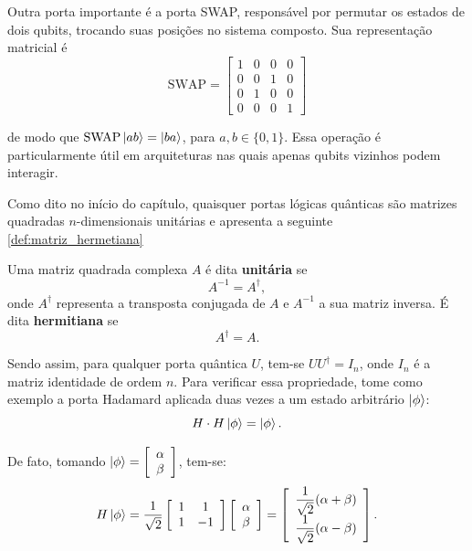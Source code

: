 Outra porta importante é a porta SWAP, responsável por permutar os estados de dois qubits, trocando suas posições no sistema composto. Sua representação matricial é
$$
    \mathrm{SWAP}= \left[
    \begin{array}{cccc}
        1 & 0 & 0 & 0\\
        0 & 0 & 1 & 0\\
        0 & 1 & 0 & 0\\
        0 & 0 & 0 & 1
    \end{array} \right]
$$

\noindent de modo que $\mathrm{SWAP}\ket{ab}=\ket{ba}$, para $a,b\in\{0,1\}$. Essa operação é particularmente útil em arquiteturas nas quais apenas qubits vizinhos podem interagir.

Como dito no início do capítulo, quaisquer portas lógicas quânticas são matrizes quadradas $n$-dimensionais unitárias e \textcite[pag. 425]{Anton2012} apresenta a seguinte
\autoref{def:matriz_hermetiana}

    \begin{defi}
        \label{def:matriz_hermetiana}
        Uma matriz quadrada complexa $A$ é dita \textbf{unitária} se $$A^{-1}=A^{\dagger},$$ onde $A^{\dagger}$ representa a transposta conjugada de $A$ e $A^{-1}$ a sua matriz inversa. É dita \textbf{hermitiana} se $$A^{\dagger}=A.$$
    \end{defi}

\noindent Sendo assim, para qualquer porta quântica $U$, tem-se $UU^{\dagger}=I_n$, onde $I_n$ é a matriz identidade de ordem $n$. Para verificar essa propriedade, tome como exemplo a porta Hadamard aplicada duas vezes a um estado arbitrário $\ket{\phi}$:
    $$
        H\cdot H\ket{\phi} = \ket{\phi}.
    $$

De fato, tomando $\ket{\phi}=\left[\begin{array}{c}
         \alpha \\
         \beta
    \end{array}\right]$, tem-se:
    $$
        H\ket{\phi}= \dfrac{1}{\sqrt{2}} \left[\begin{array}{cc}
             1 & 1 \\
             1 & -1
        \end{array}\right]\left[\begin{array}{c}
             \alpha \\
             \beta
        \end{array}\right] = \left[\begin{array}{c}
             \dfrac{1}{\sqrt{2}}(\alpha+\beta) \\
             \dfrac{1}{\sqrt{2}}(\alpha - \beta)
        \end{array}\right].
    $$

